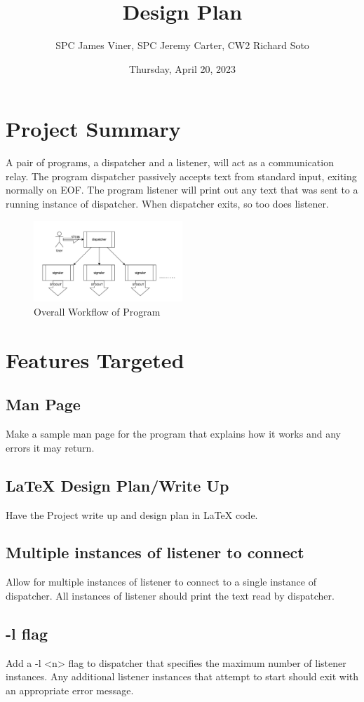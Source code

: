 \documentclass{article}
\title{Design Plan}
\author{SPC James Viner, SPC Jeremy Carter, CW2 Richard Soto}
\date{Thursday, April 20, 2023}
\begin{document}
  \maketitle
  \section*{Project Summary}
  A pair of programs, a dispatcher and a listener, will act as a communication relay.
  The program dispatcher passively accepts text from standard input, exiting normally on EOF.
  The program listener will print out any text that was sent to a running instance of dispatcher. When
  dispatcher exits, so too does listener.

  \begin{figure}[h]
  \caption{Overall Workflow of Program}
  \centering
  \includegraphics[width=0.5\textwidth]{app_img}
  \end{figure}


  \section*{Features Targeted}
  \subsection*{Man Page}
  Make a sample man page for the program that explains how it works and any errors it may return.
  \subsection*{LaTeX Design Plan/Write Up}
  Have the Project write up and design plan in LaTeX code.
  \subsection*{Multiple instances of listener to connect}
  Allow for multiple instances of listener to connect to a single instance of
  dispatcher. All instances of listener should print the text read by dispatcher.
  \subsection*{-l flag}
  Add a -l <n> flag to dispatcher
  that specifies the maximum number of listener instances. Any additional
  listener instances that attempt to start should exit with an appropriate error
  message.
\end{document}
